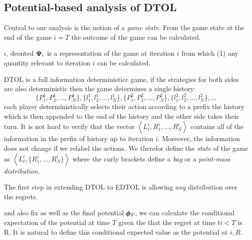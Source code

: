 \documentclass{article}[12pt]
\begin{document}
\subsection{Potential-based analysis of DTOL}


Central to our analysis is the notion of a {\em game state}. From the game
state at the end of the game $i=T$ the outcome of the game can be calculated.



$i$, deonted ${\bf \Psi}_i$ is a representation of the game at iteration $i$ from which (1) any quantity relevant to iteration $i$ can be calculated.



DTOL is a full information deterministicc game, if the strategies for
both sides are also deterministic then the game determines a single history:
\[
  \{P^1_1,P^1_2,\ldots,P^1_N\},\{l^1_1,l^1_2,\ldots,l_N^1\},
  \{P^2_1,P^2_2,\ldots,P^2_N\},\{l^2_1,l^2_2,\ldots,l_N^2\},\ldots 
\]
each player deterministically selects their action according to a
prefix the history which is then appended to the end of the history
and the other side takes their turn.  It is not hard to verify that
the vector $\left\langle L^i_\ell,R_1^i,\ldots,R_N^i \right\rangle$
contains all of the information in the prefix of history up to
iteration $i$. Moreover, the information does not change if we relabel
the actions.  We therefor define the {\em state} of the game as
$\left\langle L^i_\ell, \{R_1^i,\ldots,R_N^i\} \right\rangle$ where the curly brackets define a {\em bag} or a {\em point-mass distribution}.

The first step in extending DTOL to EDTOL is allowing {\em any}
distribution over the regrets.

and also fix as well as
the final potential $\pmb{\phi}_{T}$, we can calculate the conditional
expectation of the potential at time $T$ given the that the regret at
time $ti<T$ is R.  It is natural to define this conditional expected
value as the potential at $i,R$.
\end{document}
